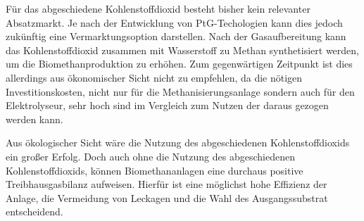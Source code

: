 Für das abgeschiedene Kohlenstoffdioxid besteht bisher kein relevanter Absatzmarkt. Je nach der Entwicklung von PtG-Techologien kann dies jedoch zukünftig eine Vermarktungsoption darstellen. Nach der Gasaufbereitung kann das Kohlenstoffdioxid zusammen mit Wasserstoff zu Methan synthetisiert werden, um die Biomethanproduktion zu erhöhen. Zum gegenwärtigen Zeitpunkt ist dies allerdings aus ökonomischer Sicht nicht zu empfehlen, da die nötigen Investitionskosten, nicht nur für die Methanisierungsanlage sondern auch für den Elektrolyseur, sehr hoch sind im Vergleich zum Nutzen der daraus gezogen werden kann.\smallskip

Aus ökologischer Sicht wäre die Nutzung des abgeschiedenen Kohlenstoffdioxids ein großer Erfolg. Doch auch ohne die Nutzung des abgeschiedenen Kohlenstoffdioxids, können Biomethananlagen eine durchaus positive Treibhausgasbilanz aufweisen. Hierfür ist eine möglichst hohe Effizienz der Anlage, die Vermeidung von Leckagen und die Wahl des Ausgangssubstrat entscheidend.